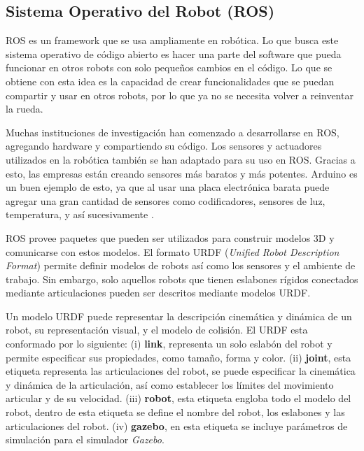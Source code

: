 \subsection{Sistema Operativo del Robot (ROS)}
ROS es un framework que se usa ampliamente en robótica. Lo que busca este sistema 
operativo de código abierto es hacer una parte del software que pueda funcionar en 
otros robots con solo pequeños cambios en el código. Lo que se obtiene con esta idea 
es la capacidad de crear funcionalidades que se puedan compartir y usar en otros robots, por 
lo que ya no se necesita volver a reinventar la rueda.

Muchas instituciones de investigación han comenzado a desarrollarse en 
ROS, agregando hardware y compartiendo su código. Los sensores y actuadores 
utilizados en la robótica también se han adaptado para su uso en ROS. Gracias 
a esto, las empresas están creando sensores más baratos y más potentes. Arduino 
es un buen ejemplo de esto, ya que al usar una placa electrónica barata puede 
agregar una gran cantidad de sensores como codificadores, sensores de luz, 
temperatura, y así sucesivamente \cite{rosIntroduction}.

ROS provee paquetes que pueden ser utilizados para construir modelos 3D y comunicarse 
con estos modelos. El formato URDF (\textit{Unified Robot Description Format}) permite 
definir modelos de robots así como los sensores y el ambiente de trabajo. Sin embargo, solo 
aquellos robots que tienen eslabones rígidos conectados mediante articulaciones pueden ser 
descritos mediante modelos URDF.

Un modelo URDF puede representar la descripción cinemática y dinámica de un robot, su 
representación visual, y el modelo de colisión. El URDF esta conformado por lo siguiente: 
(i) \textbf{link}, representa un solo eslabón del robot y permite especificar sus propiedades, 
como tamaño, forma y color. (ii) \textbf{joint}, esta etiqueta representa las articulaciones del 
robot, se puede especificar la cinemática y dinámica de la articulación, así como establecer 
los límites del movimiento articular y de su velocidad. (iii) \textbf{robot}, esta etiqueta 
engloba todo el modelo del robot, dentro de esta etiqueta se define el nombre del robot, los 
eslabones y las articulaciones del robot. (iv) \textbf{gazebo}, en esta etiqueta se incluye 
parámetros de simulación para el simulador \textit{Gazebo}.


